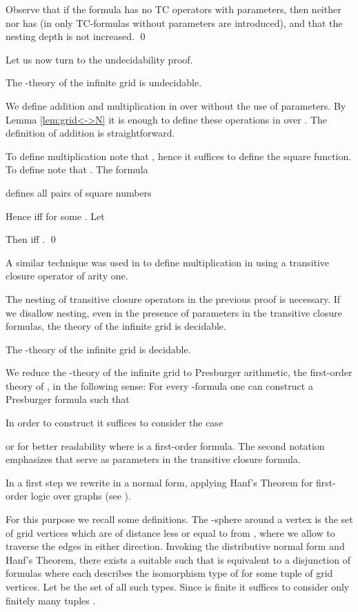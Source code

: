 \documentclass{LMCS}
\begin{document}
{Observe that if the formula  has no TC operators with parameters, then neither
 nor  has (in  only TC-formulas without parameters are introduced),
and that the nesting depth is not increased.
\qed

Let us now turn to the undecidability proof.

\begin{thm}
The -theory of the infinite grid is undecidable.
\end{thm}
\proof 
We define addition and multiplication in  over 
without the use of parameters. By Lemma \ref{lem:grid<->N} it 
is enough to  define these operations in  over 
. The definition of addition is straightforward.


To define multiplication note that ,
hence it suffices to define the square function.  To define  note that 
. The formula

defines all pairs of square numbers 

Hence  iff  for some .
Let 

Then  iff .
\qed

A similar technique was used in \cite{av03} to define multiplication in 
using a transitive closure operator of arity one.

The nesting of transitive closure operators in the previous proof is necessary. If
we disallow nesting, even in the presence of parameters in the transitive closure 
formulas, the theory of the infinite grid is decidable.

\begin{thm}
The  -theory of the infinite grid is decidable.
\end{thm}
\proof
We reduce the -theory of the infinite grid  
to Presburger arithmetic, the first-order theory of , in
the following sense: For every -formula 
one can construct  a Presburger formula  such that

In order to construct  it suffices to consider the case 
 
or for better readability 
 where  is a 
first-order formula. The second notation emphasizes that  serve as 
parameters in the transitive closure formula.

In a first step we rewrite  in a normal form, applying Hanf's Theorem for
first-order logic over graphs (see \cite{ha65,ef95,tho97a}).

For this purpose we recall some definitions. The -sphere 
around a vertex  is the set of grid vertices which are of distance 
less or equal to  from , where we allow to traverse the edges in
either direction. Invoking the distributive normal form and Hanf's Theorem,
there exists a suitable  such that  is equivalent 
to a disjunction of formulas  where each 
 describes the isomorphism type  of  for some tuple  of grid vertices. 
Let  be the set of all such types. Since  is finite
it suffices to consider only finitely many  tuples .

}
\end{document}
